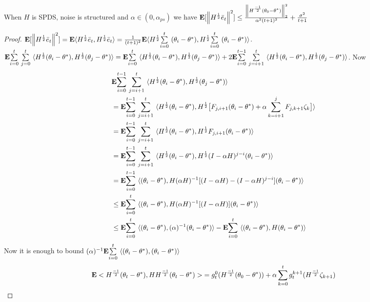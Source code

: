 \begin{theorem}\label{spdsms}
When $H$ is SPDS, noise is structured and $\alpha\in (0,\alpha_{ps})$ we have $\E[\norm{H^{\frac{1}{2}}\eb_t}^2]\leq \frac{\norm{H^{\frac{-1}{2}}(\theta_0-\ts)}^2_2}{\alpha^2(t+1)^2}+\frac{\sigma^2}{t+1}$
\end{theorem}

\begin{proof}
$\E[\norm{H^{\frac{1}{2}}\eb_t}^2]=\E\ip{H^{\frac{1}{2}}\eb_t,H^{\frac{1}{2}}\eb_t}=\frac{1}{(t+1)^2}\E\ip{H^{\frac{1}{2}}\ous{\sum}{i=0}{t}(\theta_i-\ts),H^{\frac{1}{2}}\ous{\sum}{i=0}{t}(\theta_i-\ts)}$.
$\E\ous{\sum}{i=0}{t}\ous{\sum}{j=0}{t}\ip{H^{\frac{1}{2}}(\theta_i-\theta^*),H^{\frac{1}{2}}(\theta_j-\theta^*)}=\E\ous{\sum}{i=0}{t}\ip{H^{\frac{1}{2}}(\theta_i-\theta^*),H^{\frac{1}{2}}(\theta_j-\theta^*)}+ 2\E\ous{\sum}{i=0}{t-1}\ous{\sum}{j=i+1}{t}\ip{H^{\frac{1}{2}}(\theta_i-\theta^*),H^{\frac{1}{2}}(\theta_j-\theta^*)}$. Now
\begin{align}\label{inter}
&\E\ous{\sum}{i=0}{t-1}\ous{\sum}{j=i+1}{t}\ip{H^{\frac{1}{2}}(\theta_i-\theta^*),H^{\frac{1}{2}}(\theta_j-\theta^*)}\nn\\
&=\E\ous{\sum}{i=0}{t-1}\ous{\sum}{j=i+1}{t}\ip{H^{\frac{1}{2}}(\theta_i-\theta^*),H^{\frac{1}{2}}\big[F_{j,i+1} (\theta_i-\theta^*)+\alpha\sum_{k=i+1}^j F_{j,k+1}\zeta_{k}\big]}\nn\\
&=\E\ous{\sum}{i=0}{t-1}\ous{\sum}{j=i+1}{t}\ip{H^{\frac{1}{2}}(\theta_i-\theta^*),H^{\frac{1}{2}} F_{j,i+1} (\theta_i-\theta^*)}\nn\\
&=\E\ous{\sum}{i=0}{t-1}\ous{\sum}{j=i+1}{t}\ip{H^{\frac{1}{2}}(\theta_i-\theta^*),H^{\frac{1}{2}}(I-\alpha H)^{j-i} (\theta_i-\theta^*)}\nn\\
&=\E\ous{\sum}{i=0}{t-1}\ip{(\theta_i-\theta^*),H(\alpha H)^{-1}[(I-\alpha H)-(I-\alpha H)^{j-i}] (\theta_i-\theta^*)}\nn\\
&\leq \E\ous{\sum}{i=0}{t}\ip{(\theta_i-\theta^*),H(\alpha H)^{-1}[(I-\alpha H)] (\theta_i-\theta^*)}\nn\\
&\leq \E\ous{\sum}{i=0}{t}\ip{(\theta_i-\theta^*),(\alpha)^{-1} (\theta_i-\theta^*)}- \E\ous{\sum}{i=0}{t}\ip{(\theta_i-\theta^*),H(\theta_i-\theta^*)}\nn\\
\end{align}
Now it is enough to bound $(\alpha)^{-1} \E\ous{\sum}{i=0}{t}\ip{(\theta_i-\theta^*),(\theta_i-\theta^*)}$
\begin{align*}
\E<H^{\frac{-1}{2}}(\theta_t-\theta^*),H H^{\frac{-1}{2}}(\theta_t-\theta^*)>&=g^0_t(H^{\frac{-1}{2}}(\theta_0-\theta^*))+\alpha\sum_{k=0}^t g^{k+1}_t(H^{\frac{-1}{2}}\zeta_{k+1})\\

\end{align*}
\end{proof}
